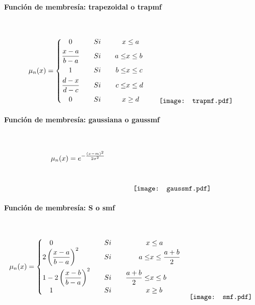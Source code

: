             \paragraph{Función de membresía: trapezoidal o trapmf}$\quad$
            
                \begin{equation}\label{eq:trapmf}
                    \mu_n(x) = \left\{
                        \begin{aligned}
                            &\quad 0  &\quad &Si \quad &  x &\leq a\\
                            &\frac{x - a}{b - a}  &\quad &Si \quad &  a \le &x \leq b \\
                            &\quad 1 &\quad &Si \quad &  b \le &x \leq c \\
                            &\frac{d - x}{d - c}  &\quad &Si \quad & c \le &x \leq d \\
                            &\quad 0  &\quad &Si \quad & x &\geq d
                        \end{aligned}\right.
                        \qquad
                        \raisebox{-15mm}{\texttt{[image: trapmf.pdf]}}
                \end{equation}

            \paragraph{Función de membresía: gaussiana o gaussmf}$\quad$
                
                \begin{equation}\label{eq:gaussmf}
                    \mu_n(x) = e^{-\frac{(x-m)^2}{2\sigma^2}}
                        \qquad \qquad
                        \raisebox{-15mm}{\texttt{[image: gaussmf.pdf]}}
                \end{equation}
                
            \paragraph{Función de membresía: S o smf}$\quad$
                
                \begin{equation}\label{eq:smf}
                    \mu_n(x) = \left\{
                        \begin{aligned}
                            &\quad 0  &\quad &Si \quad & x &\leq a\\[-4pt]
                            &2\left(\frac{x - a}{b - a}\right)^2  &\quad &Si \quad &  a \leq &x \leq \frac{a+b}{2} \\[-1pt]
                            &1 - 2\left(\frac{x - b}{b - a}\right)^2  &\quad &Si \quad & \frac{a+b}{2} \leq &x \leq b \\[-4pt]
                            &\quad 1  &\quad &Si \quad & x &\geq b
                        \end{aligned}\right.
                        \quad
                        \raisebox{-15mm}{\texttt{[image: smf.pdf]}}
                \end{equation}
            
